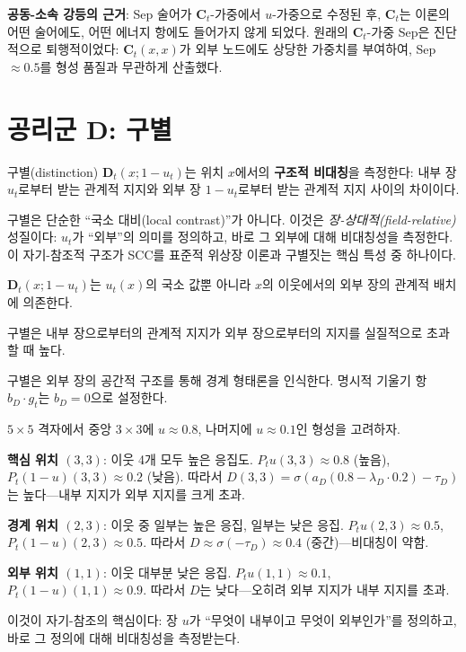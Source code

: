 \textbf{공동-소속 강등의 근거}: Sep 술어가 $\mathbf{C}_t$-가중에서 $u$-가중으로 수정된 후, $\mathbf{C}_t$는 이론의 어떤 술어에도, 어떤 에너지 항에도 들어가지 않게 되었다. 원래의 $\mathbf{C}_t$-가중 Sep은 진단적으로 퇴행적이었다: $\mathbf{C}_t(x,x)$가 외부 노드에도 상당한 가중치를 부여하여, Sep $\approx 0.5$를 형성 품질과 무관하게 산출했다.


\section{공리군 D: 구별}
\label{sec:group-d}

구별(distinction) $\mathbf{D}_t(x; 1-u_t)$는 위치 $x$에서의 \textbf{구조적 비대칭}을 측정한다: 내부 장 $u_t$로부터 받는 관계적 지지와 외부 장 $1 - u_t$로부터 받는 관계적 지지 사이의 차이이다.

구별은 단순한 ``국소 대비(local contrast)''가 아니다. 이것은 \emph{장-상대적(field-relative)} 성질이다: $u_t$가 ``외부''의 의미를 정의하고, 바로 그 외부에 대해 비대칭성을 측정한다. 이 자기-참조적 구조가 SCC를 표준적 위상장 이론과 구별짓는 핵심 특성 중 하나이다.

\begin{axiom}[D-Ax1: 외부 민감성]
$\mathbf{D}_t(x; 1-u_t)$는 $u_t(x)$의 국소 값뿐 아니라 $x$의 이웃에서의 외부 장의 관계적 배치에 의존한다.
\end{axiom}

\begin{axiom}[D-Ax2: 비대칭]
구별은 내부 장으로부터의 관계적 지지가 외부 장으로부터의 지지를 실질적으로 초과할 때 높다.
\end{axiom}

\begin{axiom}[D-Ax3: 경계 민감성, $b_D = 0$]
구별은 외부 장의 공간적 구조를 통해 경계 형태론을 인식한다. 명시적 기울기 항 $b_D \cdot g_t$는 $b_D = 0$으로 설정한다.
\end{axiom}

\begin{example}
$5 \times 5$ 격자에서 중앙 $3 \times 3$에 $u \approx 0.8$, 나머지에 $u \approx 0.1$인 형성을 고려하자.

\textbf{핵심 위치 $(3,3)$}: 이웃 4개 모두 높은 응집도. $P_t u(3,3) \approx 0.8$ (높음), $P_t(1-u)(3,3) \approx 0.2$ (낮음). 따라서 $D(3,3) = \sigma(a_D(0.8 - \lambda_D \cdot 0.2) - \tau_D)$는 높다---내부 지지가 외부 지지를 크게 초과.

\textbf{경계 위치 $(2,3)$}: 이웃 중 일부는 높은 응집, 일부는 낮은 응집. $P_t u(2,3) \approx 0.5$, $P_t(1-u)(2,3) \approx 0.5$. 따라서 $D \approx \sigma(-\tau_D) \approx 0.4$ (중간)---비대칭이 약함.

\textbf{외부 위치 $(1,1)$}: 이웃 대부분 낮은 응집. $P_t u(1,1) \approx 0.1$, $P_t(1-u)(1,1) \approx 0.9$. 따라서 $D$는 낮다---오히려 외부 지지가 내부 지지를 초과.

이것이 자기-참조의 핵심이다: 장 $u$가 ``무엇이 내부이고 무엇이 외부인가''를 정의하고, 바로 그 정의에 대해 비대칭성을 측정받는다.
\end{example}

